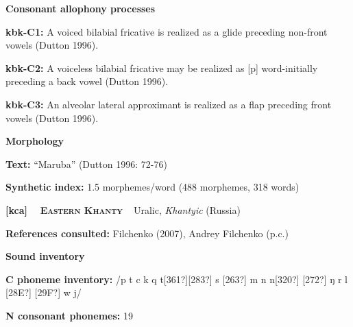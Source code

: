 \begin{styleBody}
\textbf{Consonant allophony processes}
\end{styleBody}

\begin{styleBody}
\textbf{kbk-C1: }A voiced bilabial fricative is realized as a glide preceding non-front vowels (Dutton 1996).
\end{styleBody}

\begin{styleBody}
\textbf{kbk-C2: }A voiceless bilabial fricative may be realized as [p] word-initially preceding a back vowel (Dutton 1996).
\end{styleBody}

\begin{styleBody}
\textbf{kbk-C3: }An alveolar lateral approximant is realized as a flap preceding front vowels (Dutton 1996).
\end{styleBody}

\begin{styleBody}
\textbf{Morphology}
\end{styleBody}

\begin{styleBody}
\textbf{Text:} “Maruba” (Dutton 1996: 72-76)
\end{styleBody}

\begin{styleBody}
\textbf{Synthetic index: }1.5 morphemes/word (488 morphemes, 318 words)
\end{styleBody}

\clearpage\begin{styleBody}
\textbf{[kca] }\ \ \textbf{\textsc{Eastern Khanty}}\textbf{\ \ }Uralic, \textit{Khantyic }(Russia)
\end{styleBody}

\begin{styleBody}
\textbf{References consulted: }Filchenko (2007), Andrey Filchenko (p.c.)
\end{styleBody}

\begin{styleBody}
\textbf{Sound inventory}
\end{styleBody}

\begin{styleBody}
\textbf{C phoneme inventory:} /p t c k q t[361?][283?] s [263?] m n n[320?] [272?] ŋ r l [28E?] [29F?] w j/
\end{styleBody}

\begin{styleBody}
\textbf{N consonant phonemes:} 19
\end{styleBody}

